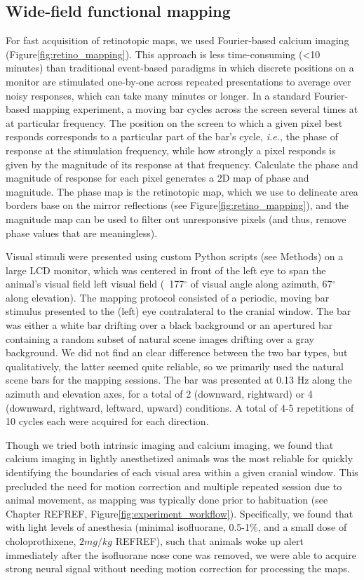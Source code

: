 \subsection{Wide-field functional mapping}
For fast acquisition of retinotopic maps, we used Fourier-based calcium imaging\cite{Kalatsky2003} (Figure\ref{fig:retino_mapping}). This approach is less time-consuming (<10 minutes) than traditional event-based paradigms in which discrete positions on a monitor are stimulated one-by-one across repeated presentations to average over noisy responses, which can take many minutes or longer. In a standard Fourier-based mapping experiment, a moving bar cycles across the screen several times at at particular frequency. The position on the screen to which a given pixel best responds corresponds to a particular part of the bar's cycle, \textit{i.e.}, the phase of response at the stimulation frequency, while how strongly a pixel responds is given by the magnitude of its response at that frequency. Calculate the phase and magnitude of response for each pixel generates a 2D map of phase and magnitude. The phase map is the retinotopic map, which we use to delineate area borders base on the mirror reflections (see Figure\ref{fig:retino_mapping}), and the magnitude map can be used to filter out unresponsive pixels (and thus, remove phase values that are meaningless). 

Visual stimuli were presented using custom Python scripts (see Methods) on a large LCD monitor, which was centered in front of the left eye to span the animal's visual field left visual field (~177$^{\circ}$ of visual angle along azimuth, 67$^{\circ}$ along elevation). The mapping protocol consisted of a periodic, moving bar stimulus\cite{Kalatsky2003, Marshel2011} presented to the (left) eye contralateral to the cranial window. The bar was either a white bar drifting over a black background or an apertured bar containing a random subset of natural scene images drifting over a gray background. We did not find an clear difference between the two bar types, but qualitatively, the latter seemed quite reliable, so we primarily used the natural scene bars for the mapping sessions. The bar was presented at 0.13 Hz along the azimuth and elevation axes, for a total of 2 (downward, rightward) or 4 (downward, rightward, leftward, upward) conditions. A total of 4-5 repetitions of 10 cycles each were acquired for each direction. 

Though we tried both intrinsic imaging and calcium imaging, we found that calcium imaging in lightly anesthetized animals was the most reliable for quickly identifying the boundaries of each visual area within a given cranial window. This precluded the need for motion correction and multiple repeated session due to animal movement, as mapping was typically done prior to habituation (see Chapter REFREF, Figure\ref{fig:experiment_workflow}). Specifically, we found that with light levels of anesthesia (minimal isofluorane, 0.5-1\%, and a small dose of choloprothixene, $2mg/kg$ REFREF), such that animals woke up alert immediately after the isofluorane nose cone was removed, we were able to acquire strong neural signal without needing motion correction for processing the maps.

